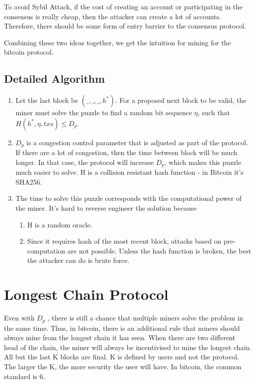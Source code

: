 \documentclass[twoside]{article}
\begin{document}
To avoid Sybil Attack, if the cost of creating an account or participating in the consensus is really cheap, then the attacker can create a lot of accounts. Therefore, there should be some form of entry barrier to the consensus protocol. 

Combining these two ideas together, we get the intuition for mining for the bitcoin protocol.

\subsection{Detailed Algorithm}
\begin{enumerate}
    \item Let the last block be $(\_, \_, \_, h^*)$. For a proposed next block to be valid, the miner must solve the puzzle to find a random bit sequence $\eta$, such that $H(h^*, \eta, txs) \leq D_p$.

    \item $D_p$ is a congestion control parameter that is adjusted as part of the protocol. If there are a lot of congestion, then the time between block will be much longer. In that case, the protocol will increase $D_p$, which makes this puzzle much easier to solve. H is a collision resistant hash function - in Bitcoin it's SHA256.

    \item The time to solve this puzzle corresponds with the computational power of the miner.  It's hard to reverse engineer the solution because 
    \begin{enumerate}
        \item H is a random oracle.
        \item Since it requires hash of the most recent block, attacks based on pre-computation are not possible. Unless the hash function is broken, the best the attacker can do is brute force.
    \end{enumerate}
\end{enumerate}
\section{Longest Chain Protocol}
Even with $D_p$ , there is still a chance that multiple miners solve the problem in the same time. Thus, in bitcoin, there is an additional rule that miners should always mine from the longest chain it has seen. When there are two different head of the chain, the miner will always be incentivised to mine the longest chain. All but the last K blocks are final. K is defined by users and not the protocol. The larger the K, the more security the user will have. In bitcoin, the common standard is 6.
\end{document}
